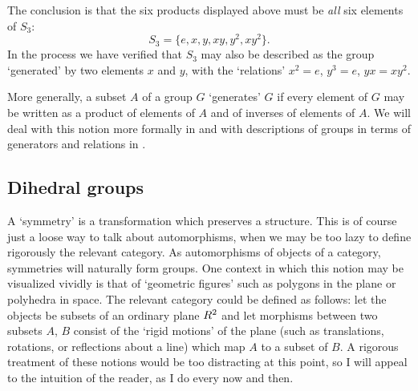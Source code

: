 The conclusion is that the six products displayed above must be
\emph{all} six elements of $S_3$:
\[
  S_3 = \{e, x, y, xy, y^2, xy^2\}.
\]
In the process we have verified that $S_3$ may also be described as
the group `generated' by two elements $x$ and $y$, with the
`relations' $x^2 = e$, $y^3 = e$, $yx = xy^2$.

More generally, a subset $A$ of a group $G$ `generates' $G$ if every
element of $G$ may be written as a product of elements of $A$ and of
inverses of elements of $A$. We will deal with this notion more
formally in
 and
with descriptions of groups in terms of generators and relations in
.

\subsection{Dihedral groups}
\label{subsec:groups:dihedral-groups}
A `symmetry' is a transformation which preserves a structure. This is
of course just a loose way to talk about automorphisms, when we may be
too lazy to define rigorously the relevant category. As automorphisms
of objects of a category, symmetries will naturally form groups.  One
context in which this notion may be visualized vividly is that of
`geometric figures' such as polygons in the plane or polyhedra in
space. The relevant category could be defined as follows: let the
objects be subsets of an ordinary plane $R^2$ and let morphisms
between two subsets $A$, $B$ consist of the `rigid motions' of the
plane (such as translations, rotations, or reflections about a line)
which map $A$ to a subset of $B$. A rigorous treatment of these
notions would be too distracting at this point, so I will appeal to
the intuition of the reader, as I do every now and then.

